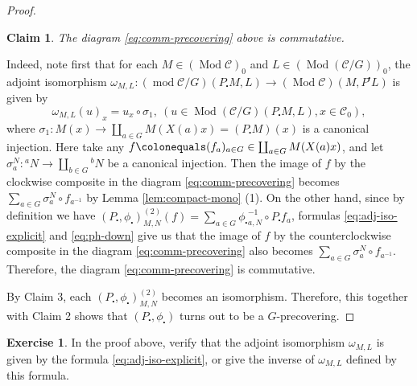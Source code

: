 \documentclass{surv-l}
\numberwithin{equation}{chapter}
\numberwithin{figure}{chapter}
\theoremstyle{plain}
\newtheorem{clm}{Claim}
\theoremstyle{definition}
\newtheorem{exc}[thm]{Exercise}
\theoremstyle{remark}
\DeclareMathOperator{\Mod}{Mod}
\begin{document}
\begin{proof}
\begin{clm}
The diagram \eqref{eq:comm-precovering} above is commutative.
\end{clm}

Indeed, note first that for each $M \in (\Mod{\mathcal{C}})_0$ and $L \in (\Mod ({\mathcal{C}}/G))_0$,
the adjoint isomorphism
$\omega_{M,L} \colon (\operatorname{mod} {\mathcal{C}}/G)(P_{\centerdot} M, L) \to (\Mod {\mathcal{C}})(M, P^{\centerdot} L)$
is given by
\begin{equation}\label{eq:adj-iso-explicit}
\omega_{M,L}(u)_x = u_x \circ \sigma_1, \ (u \in \Mod({\mathcal{C}}/G)(P_{\centerdot} M, L), x \in {\mathcal{C}}_0),
\end{equation}
where $\sigma_1 \colon M(x) \to \coprod_{a\in G} M(X(a)x) = (P_{\centerdot} M)(x)$ is a canonical injection.
Here take any
$f\colonequals  (f_a)_{a\in G} \in \coprod_{a \in G}M(X(a)x)$,
and let $\sigma_a^N \colon {}^aN \to \coprod_{b\in G} {}^bN$ be a canonical injection.
Then the image of $f$ by the clockwise composite in the diagram \eqref{eq:comm-precovering}
becomes $\sum_{a \in G} \sigma_a^N \circ f_{a^{-1}}$
by Lemma \ref{lem:compact-mono} (1).
On the other hand, since by definition we have
$(P_{\centerdot}, \phi_{\centerdot})^{(2)}_{M,N}(f) = \sum_{a \in G} {\phi_{\centerdot}}_{a,N}^{-1} \circ P_{\centerdot} f_a$,
formulas \eqref{eq:adj-iso-explicit} and \eqref{eq:ph-down} give us that
the image of $f$ by the counterclockwise composite in the diagram \eqref{eq:comm-precovering}
also becomes $\sum_{a \in G} \sigma_a^N \circ f_{a^{-1}}$.
Therefore, the diagram \eqref{eq:comm-precovering} is commutative.

By Claim 3, each $(P_{\centerdot}, \phi_{\centerdot})^{(2)}_{M,N}$ becomes an isomorphism.
Therefore, this together with Claim 2 shows that $(P_{\centerdot}, \phi_{\centerdot})$ turns out to be a $G$-precovering.
\end{proof}

\begin{exc}

In the proof above, verify that the adjoint isomorphism $\omega_{M,L}$ is given by
the formula \eqref{eq:adj-iso-explicit}, or give the inverse of $\omega_{M,L}$
defined by this formula.
\end{exc}
\end{document}
